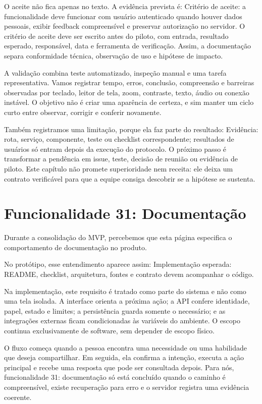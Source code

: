 \documentclass[12pt,oneside,a4paper,article]{abntex2}
\begin{document}
O aceite não fica apenas no texto. A evidência prevista é: Critério de aceite: a funcionalidade deve funcionar com usuário autenticado quando houver dados pessoais, exibir feedback compreensível e preservar autorização no servidor. O critério de aceite deve ser escrito antes do piloto, com entrada, resultado esperado, responsável, data e ferramenta de verificação. Assim, a documentação separa conformidade técnica, observação de uso e hipótese de impacto.

A validação combina teste automatizado, inspeção manual e uma tarefa representativa. Vamos registrar tempo, erros, conclusão, compreensão e barreiras observadas por teclado, leitor de tela, zoom, contraste, texto, áudio ou conexão instável. O objetivo não é criar uma aparência de certeza, e sim manter um ciclo curto entre observar, corrigir e conferir novamente.

Também registramos uma limitação, porque ela faz parte do resultado: Evidência: rota, serviço, componente, teste ou checklist correspondente; resultados de usuários só entram depois da execução do protocolo. O próximo passo é transformar a pendência em issue, teste, decisão de reunião ou evidência de piloto. Este capítulo não promete superioridade nem receita: ele deixa um contrato verificável para que a equipe consiga descobrir se a hipótese se sustenta.

\section{Funcionalidade 31: Documentação}
Durante a consolidação do MVP, percebemos que esta página especifica o comportamento de documentação no produto.

No protótipo, esse entendimento aparece assim: Implementação esperada: README, checklist, arquitetura, fontes e contrato devem acompanhar o código.

Na implementação, este requisito é tratado como parte do sistema e não como uma tela isolada. A interface orienta a próxima ação; a API confere identidade, papel, estado e limites; a persistência guarda somente o necessário; e as integrações externas ficam condicionadas às variáveis do ambiente. O escopo continua exclusivamente de software, sem depender de escopo físico.

O fluxo começa quando a pessoa encontra uma necessidade ou uma habilidade que deseja compartilhar. Em seguida, ela confirma a intenção, executa a ação principal e recebe uma resposta que pode ser consultada depois. Para nós, funcionalidade 31: documentação só está concluído quando o caminho é compreensível, existe recuperação para erro e o servidor registra uma evidência coerente.
\end{document}
